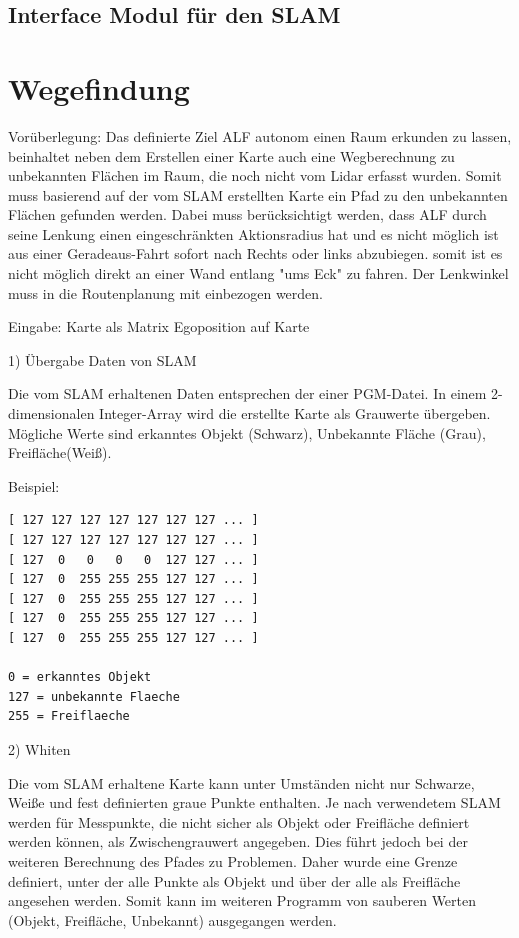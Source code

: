 \subsection{Interface Modul für den SLAM}





\section{Wegefindung}


Vorüberlegung:
Das definierte Ziel ALF autonom einen Raum erkunden zu lassen, beinhaltet neben dem Erstellen einer Karte auch eine Wegberechnung zu unbekannten Flächen im Raum, die noch nicht vom Lidar erfasst wurden. Somit muss basierend auf der vom SLAM erstellten Karte ein Pfad zu den unbekannten Flächen gefunden werden.
Dabei muss berücksichtigt werden, dass ALF durch seine Lenkung einen eingeschränkten Aktionsradius hat und es nicht möglich ist aus einer Geradeaus-Fahrt sofort nach Rechts oder links abzubiegen. somit ist es nicht möglich direkt an einer Wand entlang "ums Eck" zu fahren. Der Lenkwinkel muss in die Routenplanung mit einbezogen werden. 

Eingabe: 
Karte als Matrix
Egoposition auf Karte


1) Übergabe Daten von SLAM

Die vom SLAM erhaltenen Daten entsprechen der einer PGM-Datei. In einem 2-dimensionalen Integer-Array wird die erstellte Karte als Grauwerte übergeben. Mögliche Werte sind 
erkanntes Objekt (Schwarz),  Unbekannte Fläche (Grau),  Freifläche(Weiß).


Beispiel: 
\begin{lstlisting}
[ 127 127 127 127 127 127 127 ... ]
[ 127 127 127 127 127 127 127 ... ]
[ 127  0   0   0   0  127 127 ... ]
[ 127  0  255 255 255 127 127 ... ]
[ 127  0  255 255 255 127 127 ... ]
[ 127  0  255 255 255 127 127 ... ]
[ 127  0  255 255 255 127 127 ... ]

0 = erkanntes Objekt
127 = unbekannte Flaeche
255 = Freiflaeche

\end{lstlisting}

2) Whiten

Die vom SLAM erhaltene Karte kann unter Umständen nicht nur Schwarze, Weiße und fest definierten graue Punkte enthalten. Je nach verwendetem SLAM werden für Messpunkte, die nicht sicher als Objekt oder Freifläche definiert werden können, als Zwischengrauwert angegeben. Dies führt jedoch bei der weiteren Berechnung des Pfades zu Problemen. Daher wurde eine Grenze definiert, unter der alle Punkte als Objekt und über der alle als Freifläche angesehen werden. Somit kann im weiteren Programm von sauberen Werten (Objekt, Freifläche, Unbekannt) ausgegangen werden. 


